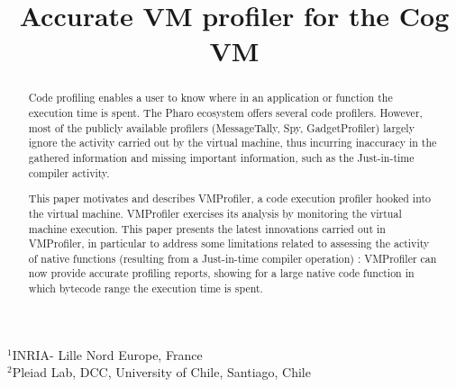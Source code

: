 \documentclass[10pt,preprint,nonatbib]{sigplanconf}
\newcommand{\Title}{Accurate VM profiler for the Cog VM}
\newcommand{\Authors}{Sophie Kaleba, Cl\'ement B\'era, Alexandre Bergel$^3$\\[2 ex]
$^3$Pleiad Lab, DCC, University of Chile}
\begin{document}
\setlength{\pdfpageheight}{\paperheight}
\setlength{\pdfpagewidth}{\paperwidth}



\title{\Title}


           {$^1$INRIA- Lille Nord Europe, France\\
             $^2$Pleiad Lab, DCC, University of Chile, Santiago, Chile}
           {}


\maketitle

\begin{abstract}

Code profiling enables a user to know where in an application or function the execution time is spent. The Pharo ecosystem offers several code profilers. However, most of the publicly available profilers (MessageTally, Spy, GadgetProfiler) largely ignore the activity carried out by the virtual machine, thus incurring inaccuracy in the gathered information and missing important information, such as the Just-in-time compiler activity.

This paper motivates and describes VMProfiler, a code execution profiler hooked into the virtual machine. VMProfiler exercises its analysis by monitoring the virtual machine execution. This paper presents the latest innovations carried out in VMProfiler, in particular to address some limitations related to assessing the activity of native functions (resulting from a Just-in-time compiler operation) : VMProfiler can now provide accurate profiling reports, showing for a large native code function in which bytecode range the execution time is spent.

%
%

\end{abstract}
\end{document}
